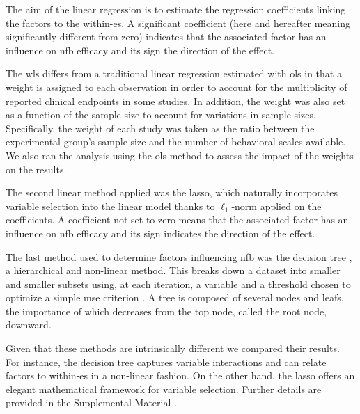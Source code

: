 The aim of the linear regression is to estimate the regression coefficients linking the factors
to the within-\gls{es}. A significant coefficient (here and hereafter meaning significantly different from zero) indicates
that the associated factor has an influence on \gls{nfb} efficacy and its sign the direction of the effect.

The \gls{wls} differs from a traditional linear regression estimated with \gls{ols} in that a weight is assigned 
to each observation in order to account for the multiplicity of reported clinical endpoints in some studies. In addition, the 
weight was also set as a function of the sample size to account for variations in sample sizes. Specifically, the weight of each study 
was taken as the ratio between the experimental group's sample size and the number of behavioral scales available.
We also ran the analysis using the \gls{ols} method to assess the impact of the weights on the results. 

The second linear method applied was the \gls{lasso}, which naturally incorporates variable selection 
into the linear model thanks to $\ell_1$-norm applied on the coefficients. A coefficient not set to zero means that 
the associated factor has an influence on \gls{nfb} efficacy and its sign indicates the direction of the effect.

The last method used to determine factors influencing \gls{nfb} was the decision tree \citep{Quinlan1986}, a hierarchical 
and non-linear method. This breaks down a dataset into smaller and smaller subsets using, at each iteration, a variable and 
a threshold chosen to optimize a simple \gls{mse} criterion \citep{James2013}. A tree is composed of several nodes and leafs, 
the importance of which decreases from the top node, called the root node, downward. 

Given that these methods are intrinsically different we compared their results. For instance, the decision
tree captures variable interactions and can relate factors to within-\gls{es} in a non-linear fashion. On the other hand, the
\gls{lasso} offers an elegant mathematical framework for variable selection. Further details are provided in the Supplemental Material
\citep{Supplementalmaterial}.















